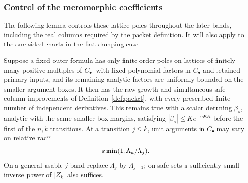 \subsubsection{Control of the meromorphic coefficients}

The following lemma controls these lattice poles throughout the later
bands, including the real columns required by the packet definition.
It will also apply to the one-sided charts in the fast-damping case.

\begin{lemma}\label{lem:mixed-poles}
Suppose a fixed outer formula has only finite-order poles on
lattices of finitely many positive multiples of $C_\bullet$, with
fixed polynomial factors in $C_\bullet$ and retained primary inputs,
and its remaining analytic factors are uniformly bounded on the
smaller argument boxes.
It then has the raw growth and simultaneous safe-column improvements
of Definition~\ref{def:packet}, with every prescribed finite number
of independent derivatives. This remains true with a scalar
detuning $\beta_s$, analytic with the same smaller-box margins, satisfying
$|\beta_s|\leq K e^{-\omega\Re R}$ before the first of the $n,k$
transitions. At a transition $j\leq k$, unit arguments in
$C_\bullet$ may vary on relative radii
\begin{equation}\label{eq:mixed-unit-radius}
 \varepsilon\min(1,\Lambda_k/\Lambda_j).
\end{equation}
On a general usable $j$ band replace $\Lambda_j$ by
$\Lambda_{j-1}$; on safe sets a sufficiently small inverse power of
$|Z_k|$ also suffices.
\end{lemma}

